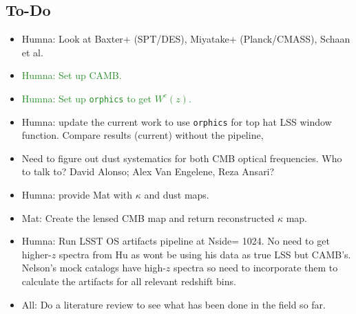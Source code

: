 \documentclass{article}
\newcommand{\done}[1]{\textcolor{ForestGreen}{#1}}
\begin{document}
{%
\subsection*{To-Do}
\begin{itemize}
\item Humna: Look at Baxter+ (SPT/DES), Miyatake+ (Planck/CMASS), Schaan et al.
\item \done{Humna: Set up CAMB.}
\item \done{Humna: Set up \texttt{orphics} to get $W^c(z)$.}
\item Humna: update the current work to use \texttt{orphics} for top hat LSS window function. Compare results (current) without the pipeline,
\item Need to figure out dust systematics for both CMB optical frequencies. Who to talk to? David Alonso; Alex Van Engelene, Reza Ansari?
\item Humna: provide Mat with $\kappa$ and dust maps.
\item Mat: Create the lensed CMB map and return reconstructed $\kappa$ map.
\item Humna: Run LSST OS artifacts pipeline at Nside= 1024. No need to get higher-$z$ spectra from Hu as wont be using his data as true LSS but CAMB's. Nelson's mock catalogs have high-$z$ spectra so need to incorporate them to calculate the artifacts for all relevant redshift bins.
\item All: Do a literature review to see what has been done in the field so far.
\end{itemize}









}
\end{document}

